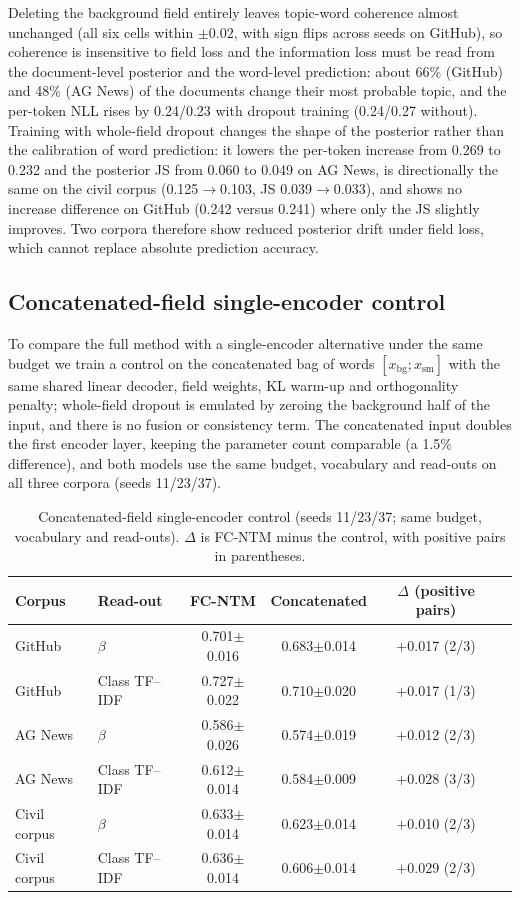 \documentclass[Journal,letterpaper]{ascelike-new}
\newcommand{\fcntm}{FC-NTM}
\begin{document}
Deleting the background field entirely leaves topic-word coherence almost unchanged (all six cells
within $\pm0.02$, with sign flips across seeds on GitHub), so coherence is insensitive to field
loss and the information loss must be read from the document-level posterior and the word-level
prediction: about 66\% (GitHub) and 48\% (AG News) of the documents change their most probable
topic, and the per-token NLL rises by 0.24/0.23 with dropout training (0.24/0.27 without).
Training with whole-field dropout changes the shape of the posterior rather than the calibration of
word prediction: it lowers the per-token increase from 0.269 to 0.232 and the posterior JS from
0.060 to 0.049 on AG News, is directionally the same on the civil corpus
(0.125$\to$0.103, JS 0.039$\to$0.033), and shows no increase difference on GitHub
(0.242 versus 0.241) where only the JS slightly improves. Two corpora therefore show reduced
posterior drift under field loss, which cannot replace absolute prediction accuracy.

\subsection{Concatenated-field single-encoder control}

To compare the full method with a single-encoder alternative under the same budget we train a
control on the concatenated bag of words $[x_{\mathrm{bg}};x_{\mathrm{sm}}]$ with the same shared
linear decoder, field weights, KL warm-up and orthogonality penalty; whole-field dropout is
emulated by zeroing the background half of the input, and there is no fusion or consistency
term. The concatenated input doubles the first encoder layer, keeping the parameter count
comparable (a 1.5\% difference), and both models use the same budget, vocabulary and read-outs
on all three corpora (seeds 11/23/37).

\begin{table}[t]
\centering
\caption{Concatenated-field single-encoder control (seeds 11/23/37; same budget, vocabulary and read-outs). $\Delta$ is \fcntm{} minus the control, with positive pairs in parentheses.}
\label{tab:concat}
\small
\begin{tabular}{llcccc}
\toprule
Corpus & Read-out & \fcntm{} & Concatenated & $\Delta$ (positive pairs) \\
\midrule
GitHub & $\beta$ & 0.701$\pm$0.016 & 0.683$\pm$0.014 & $+$0.017 (2/3) \\
GitHub & Class TF--IDF & 0.727$\pm$0.022 & 0.710$\pm$0.020 & $+$0.017 (1/3) \\
AG News & $\beta$ & 0.586$\pm$0.026 & 0.574$\pm$0.019 & $+$0.012 (2/3) \\
AG News & Class TF--IDF & 0.612$\pm$0.014 & 0.584$\pm$0.009 & $+$0.028 (3/3) \\
Civil corpus & $\beta$ & 0.633$\pm$0.014 & 0.623$\pm$0.014 & $+$0.010 (2/3) \\
Civil corpus & Class TF--IDF & 0.636$\pm$0.014 & 0.606$\pm$0.014 & $+$0.029 (2/3) \\
\bottomrule
\end{tabular}
\end{table}
\end{document}
